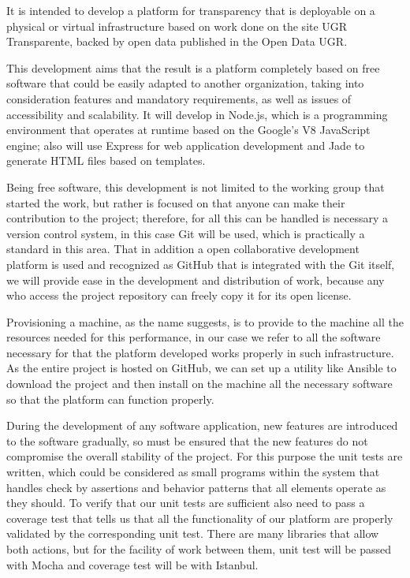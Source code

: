 {It is intended to develop a platform for transparency that is deployable on a physical or virtual infrastructure based on work 
done on the site UGR Transparente, backed by open data published in the Open Data UGR.

\bigskip
This development aims that the result is a platform completely based on free software that could be easily adapted to another 
organization, taking into consideration features and mandatory requirements, as well as issues of accessibility and scalability.
It will develop in Node.js, which is a programming environment that operates at runtime based on the Google's V8 JavaScript 
engine; also will use Express for web application development and Jade to generate HTML files based on templates.

\bigskip
Being free software, this development is not limited to the working group that started the work, but rather is focused on that 
anyone can make their contribution to the project; therefore, for all this can be handled is necessary a version control system,
in this case Git will be used, which is practically a standard in this area. That in addition a open collaborative development 
platform is used and recognized as GitHub that is integrated with the Git itself, we will provide ease in the development and 
distribution of work, because any who access the project repository can freely copy it for its open license.

\bigskip
Provisioning a machine, as the name suggests, is to provide to the machine all the resources needed for this performance, in 
our case we refer to all the software necessary for that the platform developed works properly in such infrastructure. As the 
entire project is hosted on GitHub, we can set up a utility like Ansible to download the project and then install on the 
machine all the necessary software so that the platform can function properly.

\bigskip
During the development of any software application, new features are introduced to the software gradually, so must be ensured 
that the new features do not compromise the overall stability of the project. For this purpose the unit tests are written, 
which could be considered as small programs within the system that handles check by assertions and behavior patterns that all 
elements operate as they should. To verify that our unit tests are sufficient also need to pass a coverage test that tells us 
that all the functionality of our platform are properly validated by the corresponding unit test. There are many libraries that
allow both actions, but for the facility of work between them, unit test will be passed with Mocha and coverage test will be
with Istanbul.

}
